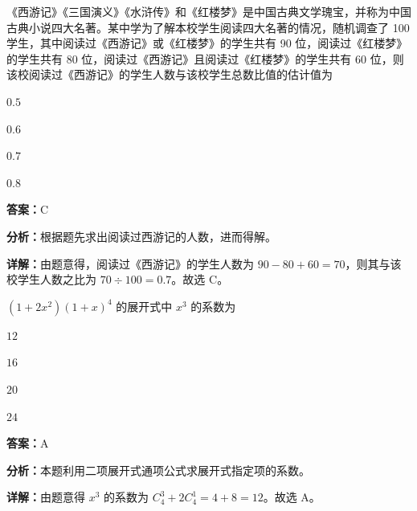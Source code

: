 \begin{question}[points=5]
《西游记》《三国演义》《水浒传》和《红楼梦》是中国古典文学瑰宝，并称为中国古典小说四大名著。某中学为了解本校学生阅读四大名著的情况，随机调查了 100 学生，其中阅读过《西游记》或《红楼梦》的学生共有 90 位，阅读过《红楼梦》的学生共有 80 位，阅读过《西游记》且阅读过《红楼梦》的学生共有 60 位，则该校阅读过《西游记》的学生人数与该校学生总数比值的估计值为
\begin{choices}
  \item $0.5$
  \item $0.6$
  \item $0.7$
  \item $0.8$
\end{choices}
\begin{solution}
\textbf{答案：}C

\textbf{分析：}根据题先求出阅读过西游记的人数，进而得解。

\textbf{详解：}由题意得，阅读过《西游记》的学生人数为 $90-80+60=70$，则其与该校学生人数之比为 $70 \div 100 = 0.7$。故选 C。
\end{solution}
\end{question}

\begin{question}[points=5]
$(1+2x^2)(1+x)^4$ 的展开式中 $x^3$ 的系数为
\begin{choices}
  \item $12$
  \item $16$
  \item $20$
  \item $24$
\end{choices}
\begin{solution}
\textbf{答案：}A

\textbf{分析：}本题利用二项展开式通项公式求展开式指定项的系数。

\textbf{详解：}由题意得 $x^3$ 的系数为 $C_4^3 + 2C_4^1 = 4 + 8 = 12$。故选 A。
\end{solution}
\end{question}

